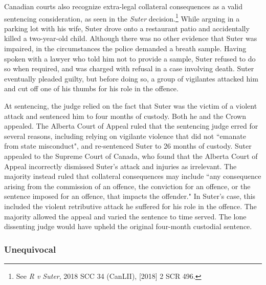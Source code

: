 Canadian courts also recognize extra-legal collateral consequences as a valid sentencing consideration, as seen in the \textit{Suter} decision.\footnote{See \textit{R v Suter}, 2018 SCC 34 (CanLII), [2018] 2 SCR 496.} While arguing in a parking lot with his wife, Suter drove onto a restaurant patio and accidentally killed a two-year-old child. Although there was no other evidence that Suter was impaired, in the circumstances the police demanded a breath sample. Having spoken with a lawyer who told him not to provide a sample, Suter refused to do so when required, and was charged with refusal in a case involving death. Suter eventually pleaded guilty, but before doing so, a group of vigilantes attacked him and cut off one of his thumbs for his role in the offence.

At sentencing, the judge relied on the fact that Suter was the victim of a violent attack and sentenced him to four months of custody. Both he and the Crown appealed. The Alberta Court of Appeal ruled that the sentencing judge erred for several reasons, including relying on vigilante violence that did not ``emanate from state misconduct", and re-sentenced Suter to 26 months of custody. Suter appealed to the Supreme Court of Canada, who found that the Alberta Court of Appeal incorrectly dismissed Suter's attack and injuries as irrelevant. The majority instead ruled that collateral consequences may include ``any consequence arising from the commission of an offence, the conviction for an offence, or the sentence imposed for an offence, that impacts the offender." In Suter's case, this included the violent retributive attack he suffered for his role in the offence. The majority allowed the appeal and varied the sentence to time served. The lone dissenting judge would have upheld the original four-month custodial sentence.

\subsubsection{Unequivocal}


